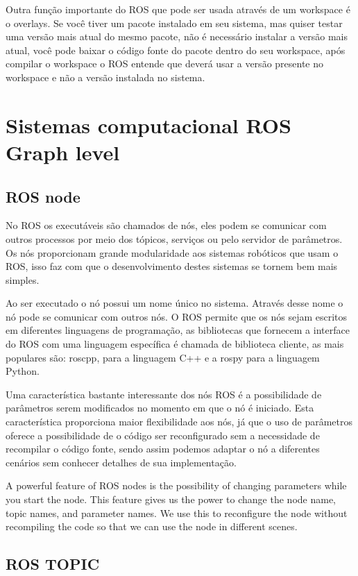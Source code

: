 Outra função importante do ROS que pode ser usada através de um workspace é o overlays. Se você tiver um pacote instalado em seu sistema, mas quiser testar uma versão mais atual do mesmo pacote, não é necessário instalar a versão mais atual, você pode baixar o código fonte do pacote dentro do seu workspace, após compilar o workspace o ROS entende que deverá usar a versão presente no workspace e não a versão instalada no sistema.


\section{Sistemas computacional ROS Graph level}

\subsection{ROS node}
No ROS os executáveis são chamados de nós, eles podem se comunicar com outros processos por meio dos tópicos, serviços ou pelo servidor de parâmetros. Os nós proporcionam grande modularidade aos sistemas robóticos que usam o ROS, isso faz com que o desenvolvimento destes sistemas se tornem bem mais simples.

Ao ser executado o nó possui um nome único no sistema. Através desse nome o nó pode se comunicar com outros nós. O ROS permite que os nós sejam escritos em diferentes linguagens de programação, as bibliotecas que fornecem a interface do ROS com uma linguagem específica é chamada de biblioteca cliente, as mais populares são: roscpp, para a linguagem C++ e a rospy para a linguagem Python.

Uma característica bastante interessante dos nós ROS é a possibilidade de parâmetros serem modificados no momento em que o nó é iniciado. Esta característica proporciona maior flexibilidade aos nós, já que o uso de parâmetros oferece a possibilidade de o código ser reconfigurado sem a necessidade de recompilar o código fonte, sendo assim podemos adaptar o nó a diferentes cenários sem conhecer detalhes de sua implementação. 


A powerful feature of ROS nodes is the possibility of changing parameters while you start the node. This feature gives us the power to change the node name, topic names, and parameter names. We use this to reconfigure the node without recompiling the code so that we can use the node in different scenes.


\subsection{ROS TOPIC}

